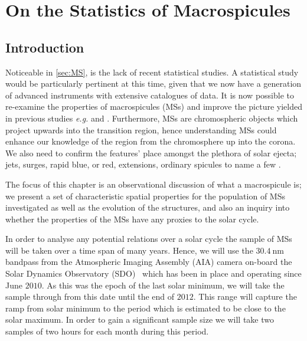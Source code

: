 
\chapter{On the Statistics of Macrospicules \label{ch:3}} 

\section{Introduction}

Noticeable in \cref{sec:MS}, is the lack of recent statistical studies.
A statistical study would be particularly pertinent at this time, given that we now have a generation of advanced instruments with extensive catalogues of data.
It is now possible to re-examine the properties of macrospicules (MSs) and improve the picture yielded in previous studies \emph{e.g.} \cite{Bohlin1975} and \cite{Dere89}. Furthermore, MSs are chromospheric objects which project upwards into the transition region, hence understanding MSs could enhance our knowledge of the region from the chromosphere up into the corona. We also need to confirm the features' place amongst the plethora of solar ejecta; jets, surges, rapid blue, or red, extensions, ordinary spicules to name a few \cite{Tsiropoula2012}.

The focus of this chapter is an observational discussion of what a macrospicule is; we present a set of characteristic spatial properties for the population of MSs investigated as well as the evolution of the structures, and also an inquiry into whether the properties of the MSs have any proxies to the solar cycle.

In order to analyse any potential relations over a solar cycle the sample of MSs will be taken over a time span of many years. Hence, we will use the $30.4\ \textrm{nm}$ bandpass from the Atmospheric Imaging Assembly (AIA) camera on-board the Solar Dynamics Observatory (SDO) \cite{AIAspec}\, which has been in place and operating since June $2010$. As this was the epoch of the last solar minimum, we will take the sample through from this date until the end of $2012$. This range will capture the ramp from solar minimum to the period which is estimated to be close to the solar maximum. In order to gain a significant sample size we will take two samples of two hours for each month during this period.

